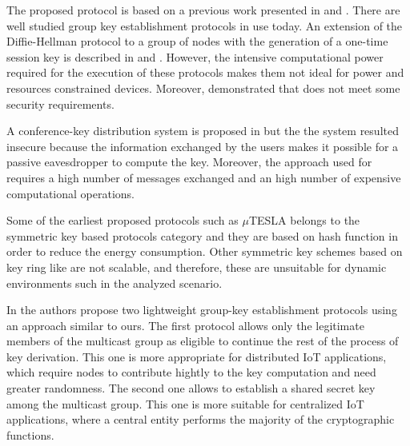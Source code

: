 \iffalse
In recent, years biometric information is utilised to an in-creasing degree to replace or enhance classical cryptographic schemes \cite{Skoric2010SecurityData}.  Popular examples are photos or finger prints in ID-documents, Iris-scans or in the future probably short tandem repeats in a human’s DNA [29].  Generally, features are extracted from the biometric data and a characteristic set of features is required to match in o
\fi

The proposed protocol is based on a previous work presented in \cite{Gebremichael2018} and \cite{Ferrari2018}.
There are well studied group key establishment protocols in use today. 
An extension of the Diffie-Hellman protocol to a group of nodes with the generation of a one-time session key is described in \cite{Steiner1996}and \cite{Bresson2007}. However, the intensive computational power required for the execution of these protocols makes them not ideal for power and resources constrained devices.
Moreover, \cite{Bohli2007} demonstrated that \cite{Bresson2007} does not meet some security requirements.

A conference-key distribution system is proposed in \cite{Ingemarsson1982} but the the system resulted insecure because the information exchanged by the users makes it possible for a passive eavesdropper to compute the key. 
Moreover, the approach used for \cite{Ingemarsson1982}  requires a high number of messages exchanged and an high number of expensive computational operations.

Some of the earliest proposed protocols such as $\mu$TESLA \cite{Perrig2002} belongs to the symmetric key based protocols category and they are based on hash function in order to reduce the energy consumption. 
Other symmetric key schemes based on key ring like \cite{Bohli2007} are not scalable, and therefore, these are unsuitable for dynamic environments such in the analyzed scenario.

In \cite{Porambage2015} the authors propose two lightweight group-key establishment protocols using an approach similar to ours.
The first protocol allows only the legitimate members of the multicast group as eligible to continue the rest of the process of key derivation. 
This one is more appropriate for distributed IoT applications, which require nodes to contribute hightly to the key computation and need greater randomness. 
The second one allows to establish a shared secret key among the multicast group. This one is more suitable for centralized IoT applications, where a central entity performs the  majority of the cryptographic functions. 

